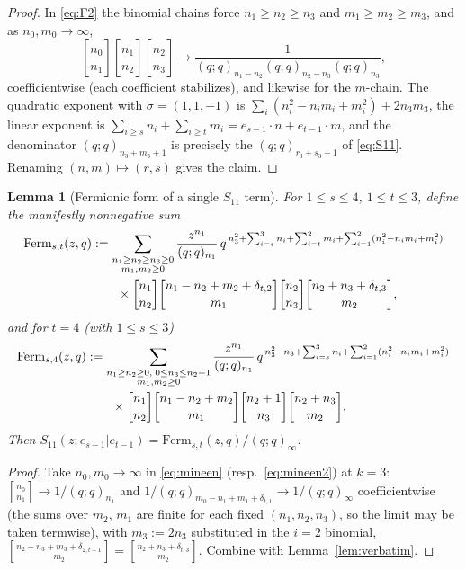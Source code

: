 \documentclass[11pt]{article}
\newtheorem{lemma}[theorem]{Lemma}
\newcommand{\qbin}[2]{\genfrac{[}{]}{0pt}{}{#1}{#2}}
\newcommand{\poch}[1]{(q;q)_{#1}}
\newcommand{\Ferm}{\mathrm{Ferm}}
\begin{document}
\begin{proof}
In \eqref{eq:F2} the binomial chains force
$n_1\ge n_2\ge n_3$ and $m_1\ge m_2\ge m_3$, and as $n_0,m_0\to\infty$,
\[
\qbin{n_0}{n_1}\qbin{n_1}{n_2}\qbin{n_2}{n_3}\longrightarrow
\frac{1}{\poch{n_1-n_2}\poch{n_2-n_3}\poch{n_3}},
\]
coefficientwise (each coefficient stabilizes), and likewise for the
$m$-chain. The quadratic exponent with $\sigma=(1,1,-1)$ is
$\sum_i(n_i^2-n_im_i+m_i^2)+2n_3m_3$, the linear exponent is
$\sum_{i\ge s}n_i+\sum_{i\ge t}m_i=e_{s-1}\cdot n+e_{t-1}\cdot m$, and the
denominator $\poch{n_3+m_3+1}$ is precisely the $\poch{r_3+s_3+1}$ of
\eqref{eq:S11}. Renaming $(n,m)\mapsto(r,s)$ gives the claim.
\end{proof}

\begin{lemma}[Fermionic form of a single $S_{11}$ term]\label{lem:ferm}
For $1\le s\le 4$, $1\le t\le 3$, define the manifestly nonnegative sum
\begin{align}\label{eq:Fermst}
\Ferm_{s,t}(z,q)&:=
\sum_{\substack{n_1\ge n_2\ge n_3\ge 0\\ m_1,m_2\ge 0}}
\frac{z^{n_1}}{\poch{n_1}}\,
q^{\,n_3^2+\sum_{i=s}^3 n_i+\sum_{i=t}^{2} m_i
+\sum_{i=1}^{2}(n_i^2-n_im_i+m_i^2)}\\
&\qquad\times
\qbin{n_1}{n_2}\qbin{n_1-n_2+m_2+\delta_{t,2}}{m_1}
\qbin{n_2}{n_3}\qbin{n_2+n_3+\delta_{t,3}}{m_2},\notag
\end{align}
and for $t=4$ (with $1\le s\le 3$)
\begin{align}\label{eq:Fermst2}
\Ferm_{s,4}(z,q)&:=
\sum_{\substack{n_1\ge n_2\ge 0,\;0\le n_3\le n_2+1\\ m_1,m_2\ge 0}}
\frac{z^{n_1}}{\poch{n_1}}\,
q^{\,n_3^2-n_3+\sum_{i=s}^3 n_i
+\sum_{i=1}^{2}(n_i^2-n_im_i+m_i^2)}\\
&\qquad\times
\qbin{n_1}{n_2}\qbin{n_1-n_2+m_2}{m_1}
\qbin{n_2+1}{n_3}\qbin{n_2+n_3}{m_2}.\notag
\end{align}
Then $S_{11}(z;e_{s-1}|e_{t-1})=\Ferm_{s,t}(z,q)/(q;q)_\infty$.
\end{lemma}

\begin{proof}
Take $n_0,m_0\to\infty$ in \eqref{eq:mineen} (resp.\ \eqref{eq:mineen2}) at
$k=3$: $\qbin{n_0}{n_1}\to1/\poch{n_1}$ and
$1/\poch{m_0-n_1+m_1+\delta_{t,1}}\to1/(q;q)_\infty$ coefficientwise (the
sums over $m_2$, $m_1$ are finite for each fixed $(n_1,n_2,n_3)$, so the
limit may be taken termwise), with $m_3:=2n_3$ substituted in the $i=2$
binomial, $\qbin{n_2-n_3+m_3+\delta_{2,t-1}}{m_2}
=\qbin{n_2+n_3+\delta_{t,3}}{m_2}$. Combine with
Lemma~\ref{lem:verbatim}.
\end{proof}
\end{document}

